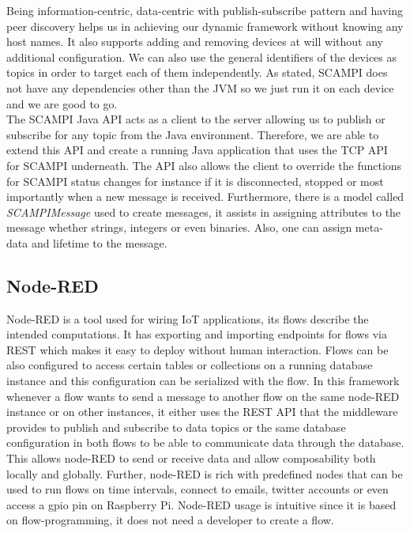 \noindent Being information-centric, data-centric with publish-subscribe pattern and having peer discovery helps us in achieving our dynamic framework without knowing any host names. It  also supports adding and removing devices at will without any additional configuration. We can also use the general identifiers of the devices as topics in order to target each of them independently. As stated, SCAMPI does not have any dependencies other than the JVM so we just run it on each device and we are  good to go. \\


\noindent The SCAMPI Java API acts as a client to the server allowing us to publish or subscribe for any topic from the Java environment. Therefore, we are able to extend this API and create a running Java application that uses the TCP API for SCAMPI underneath. The API also allows the client to override the functions for SCAMPI status changes  for instance if it is disconnected, stopped or most importantly when a new message is received. Furthermore, there is a model called \textit{SCAMPIMessage} used to create messages, it assists in assigning attributes to the message whether strings, integers or even binaries. Also, one can assign meta-data and lifetime to the message.


\subsection{Node-RED}

Node-RED is a tool used for wiring IoT applications, its flows describe the intended computations. It has exporting and importing endpoints for flows via REST which makes it easy to deploy without human interaction.  Flows can be also configured to access certain tables or collections on a running database instance and this configuration can be serialized with the flow. In this framework whenever a flow wants to send a message to another flow on the same node-RED instance or on other instances, it either uses the REST API that the middleware provides to publish and subscribe to data topics or the same database configuration in both flows to be able to communicate data through the database. This allows node-RED to send or receive data and allow composability both locally and globally.  Further, node-RED is rich with predefined nodes that  can be used to run flows on time intervals, connect to emails, twitter accounts or even access a gpio pin on Raspberry Pi. Node-RED usage is intuitive since it is based on flow-programming, it does not need a developer to create a flow.


